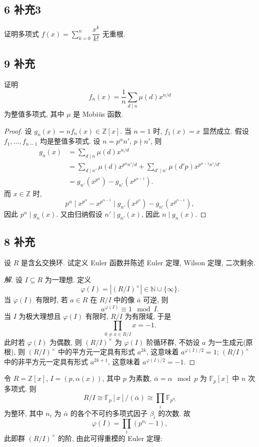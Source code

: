 \documentclass[12pt,a4paper,reqno]{amsart}
\theoremstyle{remark}
\newcommand{\Z}{\mathbb{Z}}
\newcommand{\N}{\mathbb{N}}
\newcommand{\F}{\mathbb{F}}
\begin{document}
\subsection*{6 补充3}
证明多项式 $f(x)=\sum\limits_{k=0}^n \dfrac{x^k}{k!}$ 无重根.

\subsection*{9 补充}
证明
  \[f_n(x)=\frac{1}{n}\sum_{d\mid n} \mu(d) x^{n/d}\]
为整值多项式, 其中 $\mu$ 是 Mobi\"us 函数.
\begin{proof}
设 $g_n(x)=nf_n(x)\in\Z[x]$. 当 $n=1$ 时, $f_1(x)=x$ 显然成立. 假设 $f_1,\ldots,f_{n-1}$ 均是整值多项式. 设 $n=p^\alpha n'$, $p\nmid n'$, 则
  \[\begin{split}
    g_n(x)&=\sum_{d\mid n} \mu(d) x^{n/d}\\
          &=\sum_{d\mid n'} \mu(d) x^{p^\alpha n'/d}+\sum_{d'\mid n'} \mu(d'p) x^{p^{\alpha-1} n'/d'}\\
          &=g_{n'}(x^{p^\alpha})-g_{n'}(x^{p^{\alpha-1}}).
    \end{split}\]
而 $x\in\Z$ 时,
\[p^\alpha\mid x^{p^\alpha}-x^{p^{\alpha-1}}\mid g_{n'}(x^{p^\alpha})-g_{n'}(x^{p^{\alpha-1}}),\]
因此 $p^\alpha\mid g_n(x)$. 又由归纳假设 $n'\mid g_{n'}(x)$, 因此 $n\mid g_n(x)$.
\end{proof}

\subsection*{8 补充}
设 $R$ 是含幺交换环. 试定义 Euler 函数并陈述 Euler 定理, Wilson 定理, 二次剩余.
\begin{proof}[解]
设 $I\subseteq R$ 为一理想. 定义
  \[\varphi(I)=|(R/I)^\times|\in\N\cup\{\infty\}.\]
当 $\varphi(I)$ 有限时, 若 $a\in R$ 在 $R/I$ 中的像 $\bar a$ 可逆, 则
  \[a^{\varphi(I)}\equiv 1\mod I.\]
当 $I$ 为极大理想且 $\varphi(I)$ 有限时, $R/I$ 为有限域, 于是
  \[\prod_{0\neq x\in R/I}x=-1. \]
此时若 $\varphi(I)$ 为偶数, 则 $(R/I)^\times$ 为 $\varphi(I)$ 阶循环群, 不妨设 $a$ 为一生成元(原根), 则 $(R/I)^\times$ 中的平方元一定具有形式 $a^{2k}$, 这意味着 $a^{\varphi(I)/2}=1$; $(R/I)^\times$ 中的非平方元一定具有形式 $a^{2k+1}$, 这意味着 $a^{\varphi(I)/2}=-1$.
\end{proof}

令 $R=\Z[x]$, $I=(p,\alpha(x))$, 其中 $p$ 为素数, $\bar\alpha=\alpha\mod p$ 为 $\F_p[x]$ 中 $n$ 次多项式. 则
  \[R/I\cong \F_p[x]/(\bar \alpha)\cong \prod_i \F_{p^{n_i}}\]
为整环, 其中 $n_i$ 为 $\bar\alpha$ 的各个不可约多项式因子 $\beta_i$ 的次数. 故
  \[\varphi(I)=\prod_i (p^{n_i}-1),\]
此即群 $(R/I)^\times$ 的阶, 由此可得重模的 Euler 定理:
\end{document}
